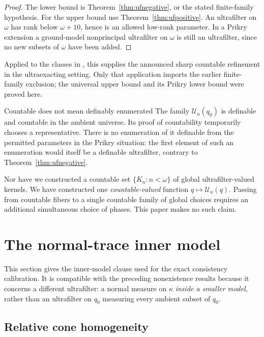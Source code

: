 \documentclass[11pt,letterpaper]{article}
\theoremstyle{definition}
\numberwithin{equation}{section}
\newcommand{\UU}{\mathscr U}
\begin{document}
\begin{proof}
The lower bound is Theorem~\ref{thm:ufnegative}, or the stated finite-family hypothesis. For the upper bound use Theorem~\ref{thm:ufpositive}. An ultrafilter on $\omega$ has rank below $\omega+10$, hence is an allowed low-rank parameter. In a Prikry extension a ground-model nonprincipal ultrafilter on $\omega$ is still an ultrafilter, since no new subsets of $\omega$ have been added.
\end{proof}

Applied to the classes in \cite[\S13, theorem on finitely additive kernels]{synthesis}, this supplies the announced sharp countable refinement in the ultraexacting setting. Only that application imports the earlier finite-family exclusion; the universal upper bound and its Prikry lower bound were proved here.

\begin{assessment}{Countable does not mean definably enumerated}
The family $\UU_u(q_0)$ is definable and countable in the ambient universe. Its proof of countability temporarily chooses a representative. There is no enumeration of it definable from the permitted parameters in the Prikry situation: the first element of such an enumeration would itself be a definable ultrafilter, contrary to Theorem~\ref{thm:ufnegative}.

Nor have we constructed a countable set $\{K_n:n<\omega\}$ of global ultrafilter-valued kernels. We have constructed one \emph{countable-valued} function $q\mapsto\UU_u(q)$. Passing from countable fibers to a single countable family of global choices requires an additional simultaneous choice of phases. This paper makes no such claim.
\end{assessment}

\section{The normal-trace inner model}\label{sec:trace}

This section gives the inner-model clause used for the exact consistency calibration. It is compatible with the preceding nonexistence results because it concerns a different ultrafilter: a normal measure on $\kappa$ \emph{inside a smaller model}, rather than an ultrafilter on $q_0$ measuring every ambient subset of $q_0$.

\subsection{Relative cone homogeneity}
\end{document}
